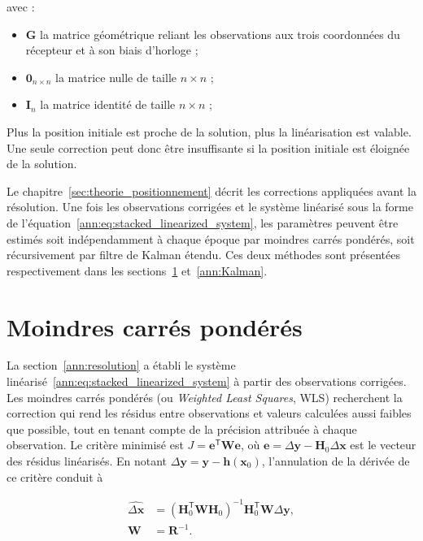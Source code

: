 avec :

\begin{itemize}
    \item $\mathbf G$ la matrice géométrique reliant les observations aux
    trois coordonnées du récepteur et à son biais d'horloge ;
    \item $\mathbf 0_{n\times n}$ la matrice nulle de taille $n\times n$ ;
    \item $\mathbf I_n$ la matrice identité de taille $n\times n$ ;
\end{itemize}

Plus la position initiale est proche de la solution, plus la linéarisation est valable. Une seule correction peut donc être insuffisante si la
position initiale est éloignée de la solution.

Le chapitre~\ref{sec:theorie_positionnement} décrit les corrections
appliquées avant la résolution. Une fois les observations corrigées et le
système linéarisé sous la forme de l'équation~\eqref{ann:eq:stacked_linearized_system},
les paramètres peuvent être estimés soit indépendamment à chaque époque par
moindres carrés pondérés, soit récursivement par filtre de Kalman étendu. Ces
deux méthodes sont présentées respectivement dans les
sections~\ref{ann:sec:wls} et~\ref{ann:Kalman}.

\section{Moindres carrés pondérés}
\label{ann:sec:wls}

La section~\ref{ann:resolution} a établi le système
linéarisé~\eqref{ann:eq:stacked_linearized_system} à partir des observations
corrigées. Les moindres carrés pondérés (ou \textit{Weighted Least Squares}, WLS) recherchent la correction qui rend les résidus
entre observations et valeurs calculées aussi faibles que possible, tout en
tenant compte de la précision attribuée à chaque observation. Le critère
minimisé est $J=\mathbf e^{\mathsf T}\mathbf W\mathbf e$, où
$\mathbf e=\Delta\mathbf y-\mathbf H_0\Delta\mathbf x$ est le vecteur des
résidus linéarisés. En notant
$\Delta\mathbf y=\mathbf y-\mathbf h(\mathbf x_0)$, l'annulation de la dérivée
de ce critère conduit à

\begin{align}
\widehat{\Delta\mathbf x}
&=
\left(\mathbf H_0^{\mathsf T}\mathbf W\mathbf H_0\right)^{-1}
\mathbf H_0^{\mathsf T}\mathbf W\Delta\mathbf y,
\\
\mathbf W
&=
\mathbf R^{-1}.
\label{ann:eq:wls_solution}
\end{align}

